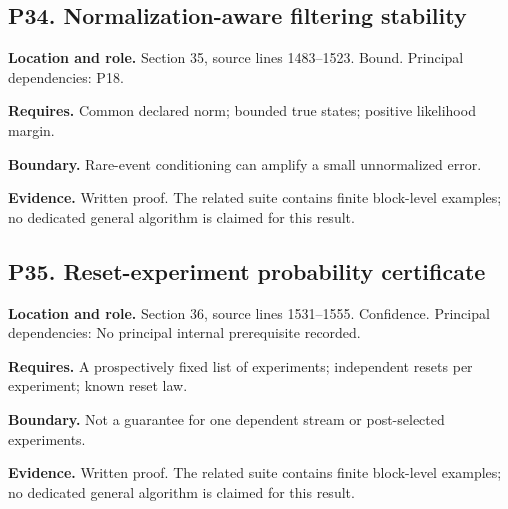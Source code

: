 \documentclass[11pt,oneside,openany]{book}
\numberwithin{equation}{section}
\begin{document}
\par\noindent\begin{minipage}{\textwidth}
\subsection{P34. Normalization-aware filtering
stability}\label{LSMRegister:p34.-normalization-aware-filtering-stability}

\textbf{Location and role.} Section 35, source lines 1483--1523. Bound.
Principal dependencies: P18.

\textbf{Requires.} Common declared norm; bounded true states; positive
likelihood margin.

\textbf{Boundary.} Rare-event conditioning can amplify a small
unnormalized error.

\textbf{Evidence.} Written proof. The related suite contains finite
block-level examples; no dedicated general algorithm is claimed for this
result.
\end{minipage}\par\medskip

\par\noindent\begin{minipage}{\textwidth}
\subsection{P35. Reset-experiment probability
certificate}\label{LSMRegister:p35.-reset-experiment-probability-certificate}

\textbf{Location and role.} Section 36, source lines 1531--1555.
Confidence. Principal dependencies: No principal internal prerequisite
recorded.

\textbf{Requires.} A prospectively fixed list of experiments;
independent resets per experiment; known reset law.

\textbf{Boundary.} Not a guarantee for one dependent stream or
post-selected experiments.

\textbf{Evidence.} Written proof. The related suite contains finite
block-level examples; no dedicated general algorithm is claimed for this
result.
\end{minipage}\par\medskip
\end{document}
